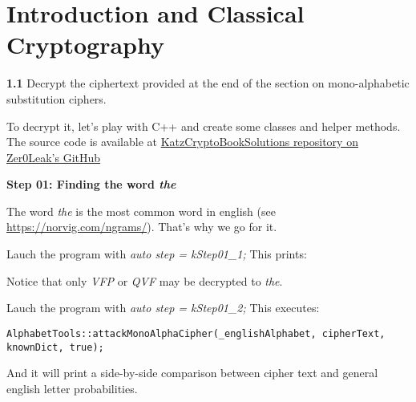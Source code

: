 \chapter{Introduction and Classical Cryptography}

\noindent
\textbf{1.1} \hspace{1em} Decrypt the ciphertext provided at the end of the section on mono-alphabetic substitution ciphers.
\vspace{1em}

To decrypt it, let's play with C++ and create some classes and helper methods. The source code is available at \href{https://github.com/Zer0Leak/KatzCryptoBookSolutions}{KatzCryptoBookSolutions repository on Zer0Leak's  GitHub}

\vspace{1em}

\textbf{Step 01: Finding the word \textit{the}} 

\vspace{1em}

The word \textit{the} is the most common word in english (see \href{https://norvig.com/ngrams/}{https://norvig.com/ngrams/}). That's why we go for it.

Lauch the program with \textit{auto step = kStep01\_1;} This prints:

\begin{center}
\end{center}


Notice that only \textit{VFP} or \textit{QVF} may be decrypted to \textit{the}.

Lauch the program with \textit{auto step = kStep01\_2;} This executes:

\begin{lstlisting}[style=cppStyle]
	AlphabetTools::attackMonoAlphaCipher(_englishAlphabet, cipherText, knownDict, true);
\end{lstlisting}

And it will print a side-by-side comparison between cipher text and general english letter probabilities.

